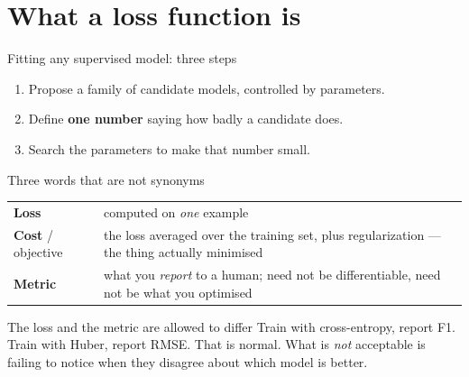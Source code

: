 \documentclass[aspectratio=169]{beamer}
\begin{document}
\section{What a loss function is}
\label{sec:what}

\begin{frame}{Fitting any supervised model: three steps}
  \begin{enumerate}
    \item<1-> Propose a family of candidate models, controlled by parameters.
    \item<2-> Define \textbf{one number} saying how badly a candidate does.
    \item<3-> Search the parameters to make that number small.
  \end{enumerate}
  \vspace{0.8em}
  \vspace{0.4em}
\end{frame}

\begin{frame}{Three words that are not synonyms}
  \begin{center}
  \small
  \begin{tabular}{@{}lp{7.6cm}@{}}
    \toprule
    \textbf{Loss} & computed on \emph{one} example\\[3pt]
    \textbf{Cost} / objective & the loss averaged over the training set,
      plus regularization --- the thing actually minimised\\[3pt]
    \textbf{Metric} & what you \emph{report} to a human; need not be
      differentiable, need not be what you optimised\\
    \bottomrule
  \end{tabular}
  \end{center}
  \vspace{0.5em}
  \begin{alertblock}{The loss and the metric are allowed to differ}
    Train with cross-entropy, report F1. Train with Huber, report RMSE.
    That is normal. What is \emph{not} acceptable is failing to notice when
    they disagree about which model is better.
  \end{alertblock}
\end{frame}
\end{document}
